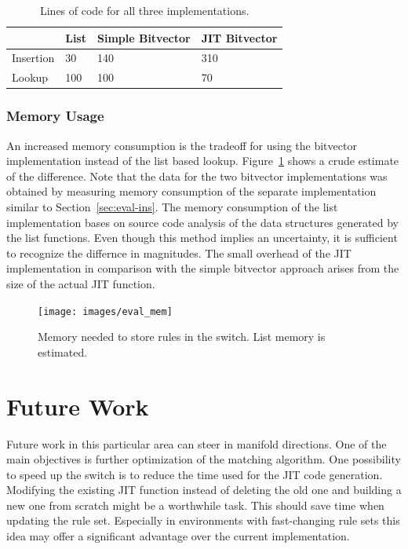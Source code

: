 \documentclass[a4paper,
		12pt,
		parskip=full,
		titlepage
		]{scrartcl}
\begin{document}
\begin{table}
  \centering
  \begin{tabularx}{\textwidth}{l|XXX}
  &List&Simple Bitvector&JIT Bitvector\\
  \hline
  Insertion&30&140&310\\
  Lookup&100&100&70\\
  \end{tabularx}
  \caption{Lines of code for all three implementations.}
  \label{table:loc}
\end{table}

\subsubsection{Memory Usage}
An increased memory consumption is the tradeoff for using the bitvector implementation
instead of the list based lookup.
Figure~\ref{fig:eval-mem} shows a crude estimate of the difference.
Note that the data for the two bitvector implementations was obtained by measuring memory consumption of the separate implementation
similar to Section~\ref{sec:eval-ins}.
The memory consumption of the list implementation bases on source code analysis of 
the data structures generated by the list functions.
Even though this method implies an uncertainty, it is sufficient to recognize the differnce in magnitudes.
The small overhead of the JIT implementation in comparison with the simple bitvector approach
arises from the size of the actual JIT function.

\begin{figure}
\centering
\texttt{[image: images/eval\_mem]}
\caption{Memory needed to store rules in the switch. List memory is estimated.}
\label{fig:eval-mem}
\end{figure}

\section{Future Work}
Future work in this particular area can steer in manifold directions.
One of the main objectives is further optimization of the matching algorithm.
One possibility to speed up the switch is to reduce the time used for the JIT code generation.
Modifying the existing JIT function instead of deleting the old one and building 
a new one from scratch might be a worthwhile task.
This should save time when updating the rule set.
Especially in environments with fast-changing rule sets this idea may offer 
a significant advantage over the current implementation.
\end{document}
